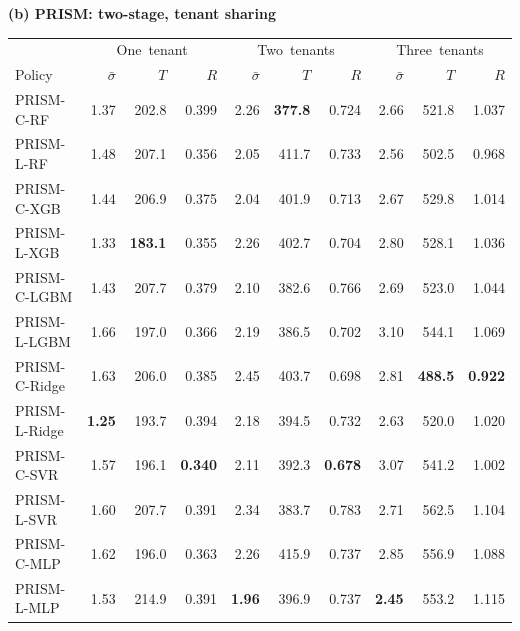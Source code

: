 \textbf{(b) PRISM: two-stage, tenant sharing}\par\smallskip
\begin{tabular*}{\linewidth}{@{\extracolsep{\fill}}lrrrrrrrrr@{}}
\toprule
 & \multicolumn{3}{c}{\mbox{One tenant}} & \multicolumn{3}{c}{\mbox{Two tenants}} & \multicolumn{3}{c}{\mbox{Three tenants}}\\
\mbox{Policy} & \mbox{$\bar\sigma$} & \mbox{$T$} & \mbox{$R$} & \mbox{$\bar\sigma$} & \mbox{$T$} & \mbox{$R$} & \mbox{$\bar\sigma$} & \mbox{$T$} & \mbox{$R$}\\\midrule
PRISM-C-RF & 1.37 & 202.8 & 0.399 & 2.26 & \textbf{377.8} & 0.724 & 2.66 & 521.8 & 1.037\\
PRISM-L-RF & 1.48 & 207.1 & 0.356 & 2.05 & 411.7 & 0.733 & 2.56 & 502.5 & 0.968\\
PRISM-C-XGB & 1.44 & 206.9 & 0.375 & 2.04 & 401.9 & 0.713 & 2.67 & 529.8 & 1.014\\
PRISM-L-XGB & 1.33 & \textbf{183.1} & 0.355 & 2.26 & 402.7 & 0.704 & 2.80 & 528.1 & 1.036\\
PRISM-C-LGBM & 1.43 & 207.7 & 0.379 & 2.10 & 382.6 & 0.766 & 2.69 & 523.0 & 1.044\\
PRISM-L-LGBM & 1.66 & 197.0 & 0.366 & 2.19 & 386.5 & 0.702 & 3.10 & 544.1 & 1.069\\
PRISM-C-Ridge & 1.63 & 206.0 & 0.385 & 2.45 & 403.7 & 0.698 & 2.81 & \textbf{488.5} & \textbf{0.922}\\
PRISM-L-Ridge & \textbf{1.25} & 193.7 & 0.394 & 2.18 & 394.5 & 0.732 & 2.63 & 520.0 & 1.020\\
PRISM-C-SVR & 1.57 & 196.1 & \textbf{0.340} & 2.11 & 392.3 & \textbf{0.678} & 3.07 & 541.2 & 1.002\\
PRISM-L-SVR & 1.60 & 207.7 & 0.391 & 2.34 & 383.7 & 0.783 & 2.71 & 562.5 & 1.104\\
PRISM-C-MLP & 1.62 & 196.0 & 0.363 & 2.26 & 415.9 & 0.737 & 2.85 & 556.9 & 1.088\\
PRISM-L-MLP & 1.53 & 214.9 & 0.391 & \textbf{1.96} & 396.9 & 0.737 & \textbf{2.45} & 553.2 & 1.115\\
\bottomrule\end{tabular*}
